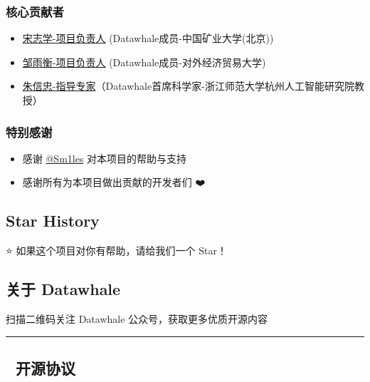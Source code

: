 \documentclass[12pt,a4paper]{book}
\begin{document}
\subsubsection{核心贡献者}\label{ux6838ux5fc3ux8d21ux732eux8005}

\begin{itemize}
\tightlist
\item
  \href{https://github.com/KMnO4-zx}{宋志学-项目负责人}
  (Datawhale成员-中国矿业大学(北京))
\item
  \href{https://github.com/logan-zou}{邹雨衡-项目负责人}
  (Datawhale成员-对外经济贸易大学)
\item
  \href{https://xinzhongzhu.github.io/}{朱信忠-指导专家}（Datawhale首席科学家-浙江师范大学杭州人工智能研究院教授）
\end{itemize}

\subsubsection{特别感谢}\label{ux7279ux522bux611fux8c22}

\begin{itemize}
\tightlist
\item
  感谢 \href{https://github.com/Sm1les}{@Sm1les} 对本项目的帮助与支持
\item
  感谢所有为本项目做出贡献的开发者们 ❤️
\end{itemize}

\subsection{Star History}\label{star-history}

⭐ 如果这个项目对你有帮助，请给我们一个 Star！

\subsection{关于 Datawhale}\label{ux5173ux4e8e-datawhale}

扫描二维码关注 Datawhale 公众号，获取更多优质开源内容

\begin{center}\rule{0.5\linewidth}{0.5pt}\end{center}

\subsection{📜 开源协议}\label{ux5f00ux6e90ux534fux8bae}
\end{document}
